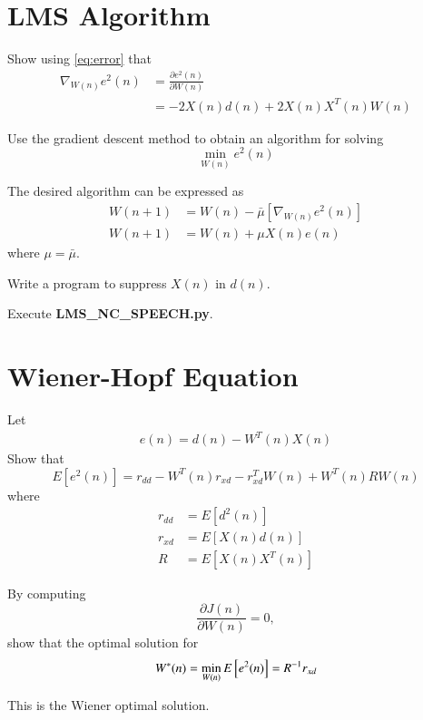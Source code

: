 \documentclass[journal,12pt,twocolumn]{IEEEtran}
\begin{document}
\section{LMS Algorithm}
%
\begin{problem}
Show using \eqref{eq:error}  that 
\begin{align}
\nabla_{W(n)}e^2(n)&=\frac{\partial e^{2}(n)}{\partial W(n)}\\
&=- 2X(n)d(n) + 2 X(n) X^{T}(n)W(n)
\end{align}
%
\end{problem}

\begin{problem}
Use the gradient descent method to obtain an algorithm for solving
\begin{equation}
\label{eq:mse}
\min_{W(n)}e^{2}(n)
\end{equation}
%
\end{problem}
\solution The desired algorithm can be expressed as
%
\begin{align}
W(n+1)&=W(n) - \bar{\mu}[ \nabla_{W(n)}e^2(n)]
\\
W(n+1)&=W(n)+ \mu X(n) e(n)
\end{align}
%
where $\mu = \bar{\mu}$.
\begin{problem}
Write a program to suppress $X(n)$ in $d(n)$.
\end{problem}
\solution Execute \textbf{LMS\_NC\_SPEECH.py}.

\section{Wiener-Hopf Equation}
\begin{problem}
Let
%
\begin{align}
e(n) = d(n)-W^{T}(n)X(n)
\end{align}
%
Show that
\begin{equation}
E[e^{2}(n)] = r_{dd} - W^{T}(n)r_{xd} - r^{T}_{xd}W(n) + W^{T}(n) R W(n)
\end{equation}
where
\begin{align}
r_{dd} &= E[d^2(n)]
\\
r_{xd} &= E[X(n)d(n)]
\\
R &= E[X(n)X^{T}(n)]
\label{eq:matrix_R}
\end{align}
\end{problem}
%
\begin{problem}
By computing 
\begin{equation}
\frac{\partial J(n)}{\partial W(n)}=0,
\end{equation}
show that the optimal solution for
%
\begin{equation}
\label{eq:wiener_opt}
W^*(n) = \min_{W(n)}E{}\left[e^2(n)\right] = R^{-1} r_{xd}
\end{equation}
%
\end{problem}
This is the Wiener optimal solution.
\end{document}
